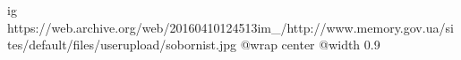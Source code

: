  
 
 
 
 

\ifcmt
  ig https://web.archive.org/web/20160410124513im_/http://www.memory.gov.ua/sites/default/files/userupload/sobornist.jpg
  @wrap center
  @width 0.9
\fi
